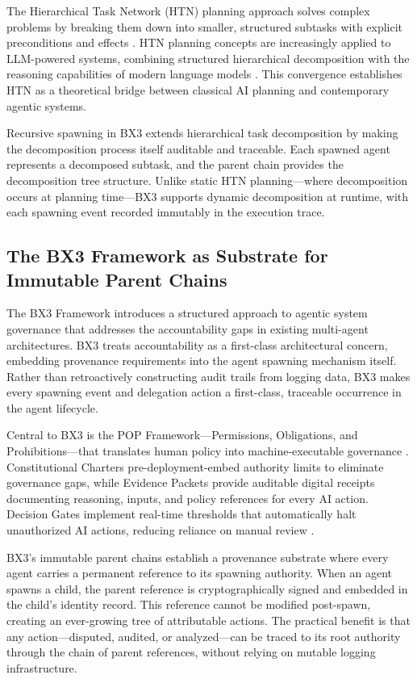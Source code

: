 The Hierarchical Task Network (HTN) planning approach solves complex problems by breaking them down into smaller, structured subtasks with explicit preconditions and effects \cite{htn_planning_gfg}. HTN planning concepts are increasingly applied to LLM-powered systems, combining structured hierarchical decomposition with the reasoning capabilities of modern language models \cite{htn_modern_agents_linkedin}. This convergence establishes HTN as a theoretical bridge between classical AI planning and contemporary agentic systems.

Recursive spawning in BX3 extends hierarchical task decomposition by making the decomposition process itself auditable and traceable. Each spawned agent represents a decomposed subtask, and the parent chain provides the decomposition tree structure. Unlike static HTN planning—where decomposition occurs at planning time—BX3 supports dynamic decomposition at runtime, with each spawning event recorded immutably in the execution trace.

\subsection{The BX3 Framework as Substrate for Immutable Parent Chains}

The BX3 Framework introduces a structured approach to agentic system governance that addresses the accountability gaps in existing multi-agent architectures. BX3 treats accountability as a first-class architectural concern, embedding provenance requirements into the agent spawning mechanism itself. Rather than retroactively constructing audit trails from logging data, BX3 makes every spawning event and delegation action a first-class, traceable occurrence in the agent lifecycle.

Central to BX3 is the POP Framework—Permissions, Obligations, and Prohibitions—that translates human policy into machine-executable governance \cite{bxai_governance}. Constitutional Charters pre-deployment-embed authority limits to eliminate governance gaps, while Evidence Packets provide auditable digital receipts documenting reasoning, inputs, and policy references for every AI action. Decision Gates implement real-time thresholds that automatically halt unauthorized AI actions, reducing reliance on manual review \cite{decision_rights_bxai}.

BX3's immutable parent chains establish a provenance substrate where every agent carries a permanent reference to its spawning authority. When an agent spawns a child, the parent reference is cryptographically signed and embedded in the child's identity record. This reference cannot be modified post-spawn, creating an ever-growing tree of attributable actions. The practical benefit is that any action—disputed, audited, or analyzed—can be traced to its root authority through the chain of parent references, without relying on mutable logging infrastructure.

